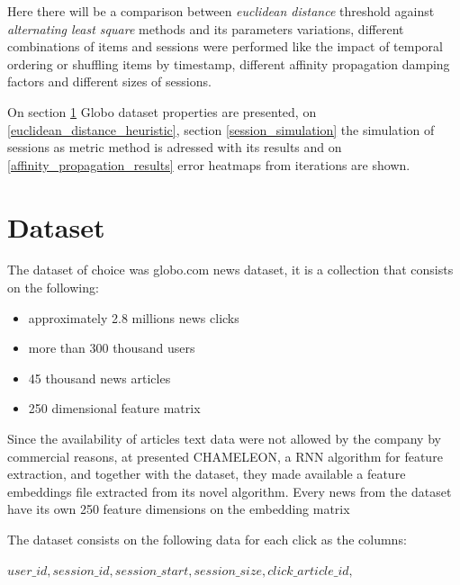 \documentclass[ecp,tc,english]{iiufrgs}
\begin{document}
    Here there will be a comparison between \textit{euclidean distance} threshold against \textit{alternating least square} methods and its parameters variations, different combinations of items and sessions were performed like the impact of temporal ordering or shuffling items by timestamp, different affinity propagation damping factors and different sizes of sessions.
    
    On section \ref{globo_dot_com_dataset} Globo dataset properties are presented, on \ref{euclidean_distance_heuristic}, section \ref{session_simulation} the simulation of sessions as metric method is adressed with its results and on \ref{affinity_propagation_results} error heatmaps from iterations are shown.

    \section{Dataset} \label{globo_dot_com_dataset}
    The dataset of choice was globo.com news dataset, it is a collection that consists on the following:
    \begin{itemize}
        \item approximately 2.8 millions news clicks
        \item more than 300 thousand users
        \item 45 thousand news articles
        \item 250 dimensional feature matrix
    \end{itemize}
    
    Since the availability of articles text data were not allowed by the company by commercial reasons, at \cite{moreira2018chameleon} presented CHAMELEON, a RNN algorithm for feature extraction, and together with the dataset, they made available a feature embeddings file extracted from its novel algorithm. Every news from the dataset have its own 250 feature dimensions on the embedding matrix
    
    The dataset consists on the following data for each click as the columns:
    
    \(user\_id, session\_id, session\_start, session\_size, click\_article\_id,\) 
    
\end{document}
